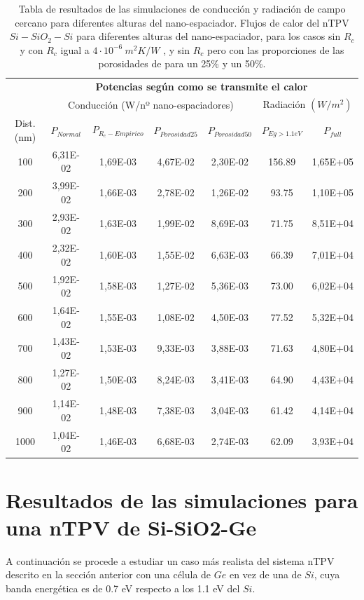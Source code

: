 \begin{table}[H]
	\centering
		\begin{tabular}{|c||c|c|c|c||c|c|}
		\hline
			\multirow{2}{*}{ }& \multicolumn{6}{c|}{\textbf{\large Potencias según como se transmite el calor}}\\ \cline{2-7}
		  & \multicolumn{4}{c||}{Conducción (W/nº nano-espaciadores)}& \multicolumn{2}{c|}{Radiación $(W/m^2)$}\\ \hline
			Dist. (nm)&$P_{Normal}$&$P_{R_c-Empirico}$&$P_{Porosidad25}$&$P_{Porosidad50}$&$P_{Eg>1.1eV}$&$P_{full}$\\ \hline \hline
			100&6,31E-02&1,69E-03&4,67E-02&2,30E-02&156.89&1,65E+05\\ \hline
			200&3,99E-02&1,66E-03&2,78E-02&1,26E-02&93.75&1,10E+05\\ \hline
			300&2,93E-02&1,63E-03&1,99E-02&8,69E-03&71.75&8,51E+04\\ \hline
			400&2,32E-02&1,60E-03&1,55E-02&6,63E-03&66.39&7,01E+04\\ \hline
			500&1,92E-02&1,58E-03&1,27E-02&5,36E-03&73.00&6,02E+04\\ \hline
			600&1,64E-02&1,55E-03&1,08E-02&4,50E-03&77.52&5,32E+04\\ \hline
			700&1,43E-02&1,53E-03&9,33E-03&3,88E-03&71.63&4,80E+04\\ \hline
			800&1,27E-02&1,50E-03&8,24E-03&3,41E-03&64.90&4,43E+04\\ \hline
			900&1,14E-02&1,48E-03&7,38E-03&3,04E-03&61.42&4,14E+04\\ \hline
		 1000&1,04E-02&1,46E-03&6,68E-03&2,74E-03&62.09&3,93E+04\\ \hline
		\end{tabular}
	\caption{Tabla de resultados de las simulaciones de conducción y radiación de campo cercano para diferentes alturas del nano-espaciador. Flujos de calor del nTPV $Si-SiO_2-Si$ para diferentes alturas del nano-espaciador, para los casos sin $R_c$ y con $R_c$ igual a $4 \cdot 10^{-6} \ m^2 K/W$ \cite{nf_TPV_Pillars_SiO2}, y sin $R_c$ pero con las proporciones de las porosidades de \cite{ThermalConductivity_SiO2_2018} para un 25\% y un 50\%.}
	\label{tab:condTerSiSiO2Si}
\end{table}
\vfill \newpage
\section{Resultados de las simulaciones para una nTPV de Si-SiO2-Ge}\label{sec:res_SiSiO2Ge}
A continuación se procede a estudiar un caso más realista del sistema nTPV descrito en la sección anterior con una célula de $Ge$ en vez de una de $Si$, cuya banda energética es de 0.7 eV respecto a los 1.1 eV del $Si$.
